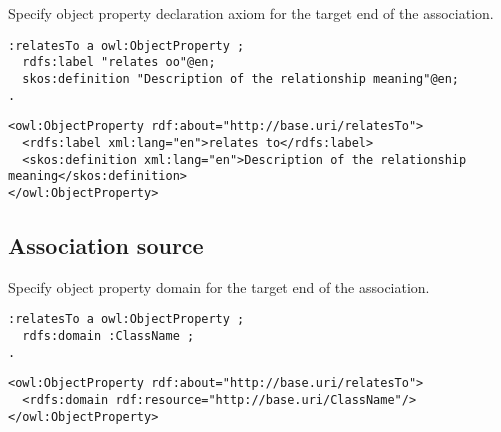 \begin{trule}
	\label{rule:association-uni-core}
	Specify object property declaration axiom for the target end of the association. 
\end{trule}

\vspace{-\parskip}
\begin{minipage}[b]{.385\textwidth}
\begin{lstlisting}[language=Turtle, caption={Property declaration in Turtle syntax}, captionpos=b]
:relatesTo a owl:ObjectProperty ;
  rdfs:label "relates oo"@en;
  skos:definition "Description of the relationship meaning"@en;
.
\end{lstlisting}
\end{minipage}%
\quad\vspace{-\parskip}
\begin{minipage}[b]{.6\textwidth}
\begin{lstlisting}[language=RDF/XML, caption={Property declaration in  RDF/XML syntax}, captionpos=b]
<owl:ObjectProperty rdf:about="http://base.uri/relatesTo">
  <rdfs:label xml:lang="en">relates to</rdfs:label>
  <skos:definition xml:lang="en">Description of the relationship meaning</skos:definition> 
</owl:ObjectProperty>  
\end{lstlisting}
\end{minipage}
\vspace{-\parskip}

\subsection{Association source}

\begin{trule}
	\label{rule:association-uni-domain-rc}
	Specify object property domain for the target end of the association. 
\end{trule}

\vspace{-\parskip}
\begin{minipage}[b]{.385\textwidth}
\begin{lstlisting}[language=Turtle, caption={Domain specification in Turtle syntax}, captionpos=b]
:relatesTo a owl:ObjectProperty ;
  rdfs:domain :ClassName ;
.
\end{lstlisting}
\end{minipage}%
\quad\vspace{-\parskip}
\begin{minipage}[b]{.6\textwidth}
\begin{lstlisting}[language=RDF/XML, caption={Domain specification in  RDF/XML syntax}, captionpos=b]
<owl:ObjectProperty rdf:about="http://base.uri/relatesTo">
  <rdfs:domain rdf:resource="http://base.uri/ClassName"/>
</owl:ObjectProperty>
\end{lstlisting}
\end{minipage}
\vspace{-\parskip}


